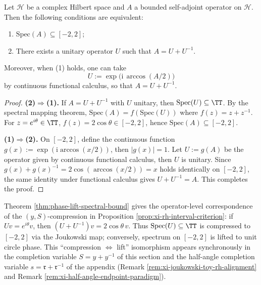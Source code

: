 \begin{theorem}\label{thm:phase-lift-spectral-bound}
Let \(\mathcal H\) be a complex Hilbert space and \(A\) a bounded self-adjoint operator on \(\mathcal H\).
Then the following conditions are equivalent:
\begin{enumerate}
  \item \(\mathrm{Spec}(A)\subseteq[-2,2]\);
  \item There exists a unitary operator \(U\) such that \(A=U+U^{-1}\).
\end{enumerate}
Moreover, when (1) holds, one can take
\[
\boxed{\ U:=\exp\!\bigl(\mathrm{i}\,\arccos(A/2)\bigr)\ }
\]
by continuous functional calculus, so that \(A=U+U^{-1}\).
\end{theorem}
\begin{proof}
\textbf{(2)\(\Rightarrow\)(1).}
If \(A=U+U^{-1}\) with \(U\) unitary, then \(\mathrm{Spec}(U)\subseteq\TT\).
By the spectral mapping theorem, \(\mathrm{Spec}(A)=f(\mathrm{Spec}(U))\) where \(f(z)=z+z^{-1}\).
For \(z=e^{i\theta}\in\TT\), \(f(z)=2\cos\theta\in[-2,2]\), hence \(\mathrm{Spec}(A)\subseteq[-2,2]\).
\par
\textbf{(1)\(\Rightarrow\)(2).}
On \([-2,2]\), define the continuous function \(g(x):=\exp(\mathrm{i}\arccos(x/2))\), then \(|g(x)|=1\).
Let \(U:=g(A)\) be the operator given by continuous functional calculus, then \(U\) is unitary.
Since \(g(x)+g(x)^{-1}=2\cos(\arccos(x/2))=x\) holds identically on \([-2,2]\),
the same identity under functional calculus gives
\(
U+U^{-1}=A
\).
This completes the proof.
\end{proof}

\begin{remark}\label{rem:phase-lift-joukowski-operator}
Theorem \ref{thm:phase-lift-spectral-bound} gives the operator-level correspondence of the \((y,S)\)-compression in Proposition \ref{prop:xi-rh-interval-criterion}: if \(Uv=e^{i\theta}v\), then \((U+U^{-1})v=2\cos\theta\,v\).
Thus \(\mathrm{Spec}(U)\subseteq\TT\) is compressed to \([-2,2]\) via the Joukowski map; conversely, spectrum on \([-2,2]\) is lifted to unit circle phase.
This ``compression \(\Leftrightarrow\) lift'' isomorphism appears synchronously in the completion variable \(S=y+y^{-1}\) of this section and the half-angle completion variable \(s=\mathfrak{r}+\mathfrak{r}^{-1}\) of the appendix (Remark \ref{rem:xi-joukowski-toy-rh-alignment} and Remark \ref{rem:xi-half-angle-endpoint-paradigm}).
\end{remark}

